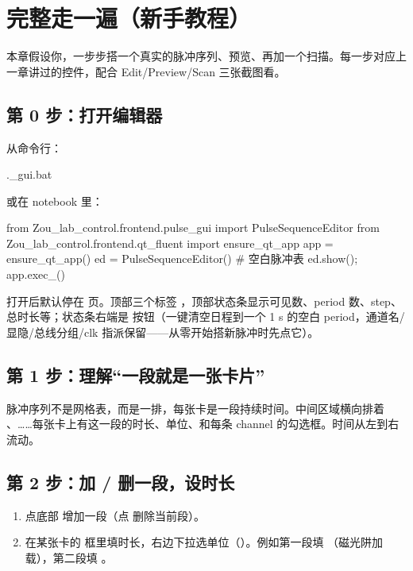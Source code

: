 \documentclass[11pt,oneside,openany]{book}
\begin{document}
\chapter{完整走一遍（新手教程）}
本章假设你，一步步搭一个真实的脉冲序列、预览、再加一个扫描。每一步对应上一章讲过的控件，配合 Edit/Preview/Scan 三张截图看。

\section{第 0 步：打开编辑器}
从命令行：

\begin{codeblock}[PowerShell]
.\pulse_gui.bat
\end{codeblock}

或在 notebook 里：

\begin{codeblock}[Python]
from Zou_lab_control.frontend.pulse_gui import PulseSequenceEditor
from Zou_lab_control.frontend.qt_fluent import ensure_qt_app
app = ensure_qt_app()
ed = PulseSequenceEditor()        # 空白脉冲表
ed.show(); app.exec_()
\end{codeblock}

打开后默认停在  页。顶部三个标签 ，顶部状态条显示可见数、period 数、step、总时长等；状态条右端是  按钮（一键清空日程到一个 1 \textmu s 的空白 period，通道名/显隐/总线分组/clk 指派保留——从零开始搭新脉冲时先点它）。

\section{第 1 步：理解“一段就是一张卡片”}
脉冲序列不是网格表，而是一排，每张卡是一段持续时间。中间区域横向排着 、……每张卡上有这一段的时长、单位、和每条 channel 的勾选框。时间从左到右流动。

\section{第 2 步：加 / 删一段，设时长}
\begin{enumerate}
  \item 点底部  增加一段（点  删除当前段）。
  \item 在某张卡的  框里填时长，右边下拉选单位（）。例如第一段填 （磁光阱加载），第二段填 。
\end{enumerate}
\end{document}
